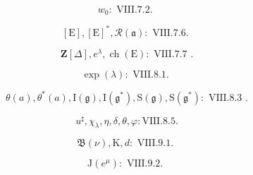 \[
w _ {0} \colon \text {   VIII.7.2.   }
\]

\[
[ \mathrm{E} ], [ \mathrm{E} ] ^ {*}, \mathscr {R} (\mathfrak {a}): \text {   VIII.7.6.   }
\]

\[
\mathbf {Z} [ \Delta ], e ^ {\lambda}, \operatorname{ch} (\mathrm{E}) \colon \text { VIII.7.7 }.
\]

\[
\exp (\lambda): \text {   VIII.8.1.   }
\]

\[
\theta (a), \theta^ {*} (a), \mathrm{I} (\mathfrak {g}), \mathrm{I} (\mathfrak {g} ^ {*}), \mathrm{S} (\mathfrak {g}), \mathrm{S} (\mathfrak {g} ^ {*}) \colon \text { VIII.8.3 }.
\]

\[
u ^ {\sharp}, \chi_ {\lambda}, \eta , \delta , \theta , \varphi : \mathrm{VIII.8.5}.
\]

\[
\mathfrak {B} (\nu), \mathrm{K}, d: \text {   VIII.9.1.   }
\]

\[
\mathrm{J} (e ^ {\mu}) \colon \text { VIII.9.2. }
\]

